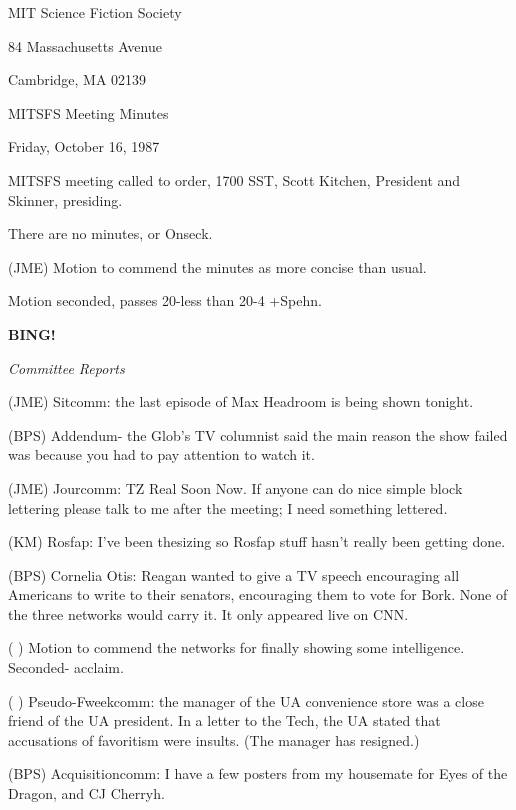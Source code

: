 \documentclass[12pt]{article}
\newcommand{\bing}{{\bf BING!} }
\newcommand{\goto}[1]{\bing \vskip 12pt \centerline{{\em{#1}}}}
\begin{document}
\begin{center}

MIT Science Fiction Society 

84 Massachusetts Avenue

Cambridge, MA 02139

\vspace{12pt}

MITSFS Meeting Minutes 

Friday, October 16, 1987

\end{center}
 
\vspace{18pt}

\setlength{\parskip}{6pt}

\noindent
MITSFS meeting called to order, 1700 SST,
Scott Kitchen, President and Skinner, presiding.

There are no minutes, or Onseck.

(JME) Motion to commend the minutes as more concise than usual.

Motion seconded, passes 20-less than 20-4 +Spehn.

\goto{Committee Reports}

(JME) Sitcomm: the last episode of Max Headroom is being shown tonight.

(BPS) Addendum- the Glob's TV columnist said the main reason the show failed was because you had to pay attention to watch it.

(JME) Jourcomm: TZ Real Soon Now. If anyone can do nice simple block lettering please talk to me after the meeting; I need something lettered.

(KM) Rosfap: I've been thesizing so Rosfap stuff hasn't really been getting done.

(BPS) Cornelia Otis: Reagan wanted to give a TV speech encouraging all Americans to write to their senators, encouraging them to vote for Bork. None of the three networks would carry it. It only appeared live on CNN.

( ) Motion to commend the networks for finally showing some intelligence. Seconded- acclaim.

( ) Pseudo-Fweekcomm: the manager of the UA convenience store was a close friend of the UA president. In a letter to the Tech, the UA stated that accusations of favoritism were insults. (The manager has resigned.)

(BPS) Acquisitioncomm: I have a few posters from my housemate for Eyes of the Dragon, and CJ Cherryh.
\end{document}
